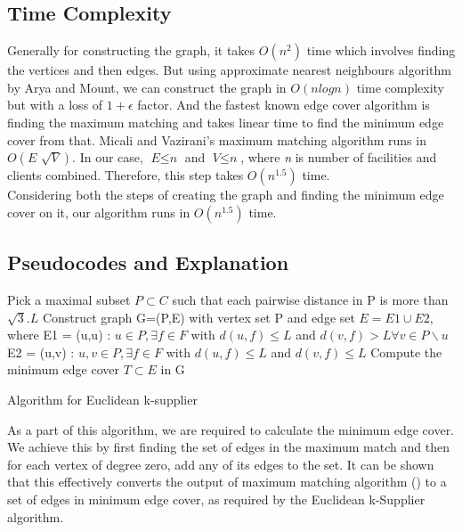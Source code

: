 \documentclass[12pt, a4paper]{article}
\begin{document}
 \subsection{Time Complexity}
Generally for constructing the graph, it takes $O(n^2)$ time which involves finding the vertices and then edges. But using approximate nearest neighbours algorithm by Arya and Mount, we can construct the graph in $O(nlog{}n)$ time complexity but with a loss of $1+\epsilon$ factor.
And the fastest known edge cover algorithm is finding the maximum matching and takes linear time to find the minimum edge cover from that. Micali and Vazirani's maximum matching algorithm runs in $O(\textit{E $\sqrt{V}$})$. In our case, $\textit{E} \leq \textit{n}$ and $\textit{V} \leq \textit{n}$, where \textit{n} is number of facilities and clients combined. Therefore, this step takes $O(n^{1.5})$ time. \\
Considering both the steps of creating the graph and finding the minimum edge cover on it, our algorithm runs in $O(n^{1.5})$ time.


\subsection{Pseudocodes and Explanation}
\begin{algorithm}[H]
 Pick a maximal subset $P \subset C$ such that each pairwise distance in P is more than $\sqrt{3}.L$\;
 Construct graph G=(P,E) with vertex set P and edge set $E = E1 \cup E2$, where \newline
 E1 =  {(u,u) : $ u \in P, \exists f \in F $ with $d(u,f) \leq L$ and $d(v,f) > L \forall v \in P\backslash u$}\;
 E2 =  {(u,v) : $u,v \in P, \exists f \in F$ with $d(u,f) \leq L$ and $d(v,f) \leq L$}\;
 Compute the minimum edge cover $T \subset E$ in G\;
 \caption{Algorithm for Euclidean k-supplier\newline}
 \end{algorithm}

As a part of this algorithm, we are required to calculate the minimum edge cover. We achieve this by first finding the set of edges in the maximum match and then for each vertex of degree zero, add any of its edges to the set. It can be shown that this effectively converts the output of maximum matching algorithm (\cite{MicaliVazirani}) to a set of edges in minimum edge cover, as required by the Euclidean k-Supplier algorithm.\\
\end{document}
